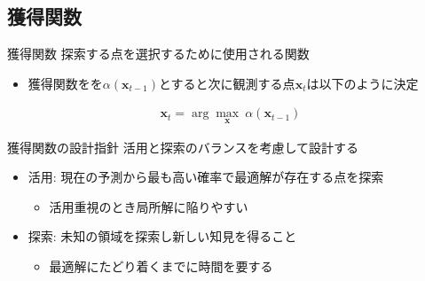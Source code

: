 \documentclass[dvipdfmx, 10.5pt]{beamer}
\begin{document}


\subsection{獲得関数}
\begin{frame}{\insertsubsection}
	\begin{block}{獲得関数}
		探索する点を選択するために使用される関数 %
	\end{block}
	\begin{itemize}
		\item 獲得関数をを$\alpha(\bm x_{t-1})$とすると次に観測する点$\bm x_t$は以下のように決定
	\end{itemize}
	\begin{align*}
		\bm x_t = \arg \max_{\bm x} ~ \alpha(\bm x_{t-1})
	\end{align*}
	\begin{block}{獲得関数の設計指針}
		活用と探索のバランスを考慮して設計する
	\end{block}
	\begin{itemize}
		\item 活用: 現在の予測から最も高い確率で最適解が存在する点を探索
		\begin{itemize}
			\item 活用重視のとき局所解に陥りやすい
		\end{itemize}
		\item 探索: 未知の領域を探索し新しい知見を得ること
		\begin{itemize}
			\item 最適解にたどり着くまでに時間を要する
		\end{itemize}
	\end{itemize}

\end{frame}

\end{document}
